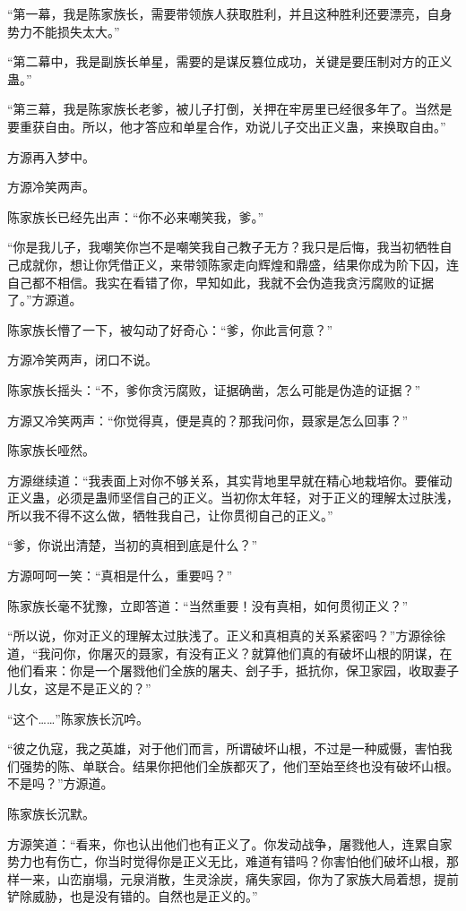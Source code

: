 \begin{this_body}
“第一幕，我是陈家族长，需要带领族人获取胜利，并且这种胜利还要漂亮，自身势力不能损失太大。”

“第二幕中，我是副族长单星，需要的是谋反篡位成功，关键是要压制对方的正义蛊。”

“第三幕，我是陈家族长老爹，被儿子打倒，关押在牢房里已经很多年了。当然是要重获自由。所以，他才答应和单星合作，劝说儿子交出正义蛊，来换取自由。”

方源再入梦中。

方源冷笑两声。

陈家族长已经先出声：“你不必来嘲笑我，爹。”

“你是我儿子，我嘲笑你岂不是嘲笑我自己教子无方？我只是后悔，我当初牺牲自己成就你，想让你凭借正义，来带领陈家走向辉煌和鼎盛，结果你成为阶下囚，连自己都不相信。我实在看错了你，早知如此，我就不会伪造我贪污腐败的证据了。”方源道。

陈家族长懵了一下，被勾动了好奇心：“爹，你此言何意？”

方源冷笑两声，闭口不说。

陈家族长摇头：“不，爹你贪污腐败，证据确凿，怎么可能是伪造的证据？”

方源又冷笑两声：“你觉得真，便是真的？那我问你，聂家是怎么回事？”

陈家族长哑然。

方源继续道：“我表面上对你不够关系，其实背地里早就在精心地栽培你。要催动正义蛊，必须是蛊师坚信自己的正义。当初你太年轻，对于正义的理解太过肤浅，所以我不得不这么做，牺牲我自己，让你贯彻自己的正义。”

“爹，你说出清楚，当初的真相到底是什么？”

方源呵呵一笑：“真相是什么，重要吗？”

陈家族长毫不犹豫，立即答道：“当然重要！没有真相，如何贯彻正义？”

“所以说，你对正义的理解太过肤浅了。正义和真相真的关系紧密吗？”方源徐徐道，“我问你，你屠灭的聂家，有没有正义？就算他们真的有破坏山根的阴谋，在他们看来：你是一个屠戮他们全族的屠夫、刽子手，抵抗你，保卫家园，收取妻子儿女，这是不是正义的？”

“这个……”陈家族长沉吟。

“彼之仇寇，我之英雄，对于他们而言，所谓破坏山根，不过是一种威慑，害怕我们强势的陈、单联合。结果你把他们全族都灭了，他们至始至终也没有破坏山根。不是吗？”方源道。

陈家族长沉默。

方源笑道：“看来，你也认出他们也有正义了。你发动战争，屠戮他人，连累自家势力也有伤亡，你当时觉得你是正义无比，难道有错吗？你害怕他们破坏山根，那样一来，山峦崩塌，元泉消散，生灵涂炭，痛失家园，你为了家族大局着想，提前铲除威胁，也是没有错的。自然也是正义的。”


\end{this_body}
